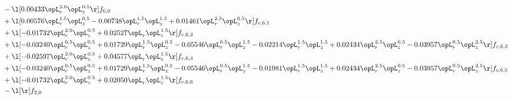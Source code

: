 \begin{alignat}{2}
& - \l[  0.00433 \opL_r^{2.0} \opL_z^{0.5}  \r] f_{6,0} \nonumber \\ 
& + \l[  0.00576 \opL_r^{1.5} \opL_z^{0.5}   -0.00738 \opL_r^{1.5} \opL_z^{1.5} +  0.01461 \opL_r^{2.5} \opL_z^{0.5}  \r] f_{c,6,1} \nonumber \\ 
& + \l[  -0.01732 \opL_r^{2.0} \opL_z^{0.5} +  0.02527 \opL_r \opL_z^{1.5}  \r] f_{c,6,2} \nonumber \\ 
& + \l[  -0.03240 \opL_r^{0.5} \opL_z^{0.5} +  0.01729 \opL_r^{1.5} \opL_z^{0.5}   -0.05546 \opL_r^{0.5} \opL_z^{1.5}   -0.02214 \opL_r^{1.5} \opL_z^{1.5} +  0.02434 \opL_r^{2.5} \opL_z^{0.5}   -0.03957 \opL_r^{0.5} \opL_z^{2.5}  \r] f_{c,6,3} \nonumber \\ 
& + \l[  -0.02597 \opL_r^{2.0} \opL_z^{0.5} +  0.04577 \opL_r \opL_z^{1.5}  \r] f_{c,6,4} \nonumber \\ 
& + \l[  -0.03240 \opL_r^{0.5} \opL_z^{0.5} +  0.01729 \opL_r^{1.5} \opL_z^{0.5}   -0.05546 \opL_r^{0.5} \opL_z^{1.5}   -0.01981 \opL_r^{1.5} \opL_z^{1.5} +  0.02434 \opL_r^{2.5} \opL_z^{0.5}   -0.03957 \opL_r^{0.5} \opL_z^{2.5}  \r] f_{c,6,5} \nonumber \\ 
& + \l[  -0.01732 \opL_r^{2.0} \opL_z^{0.5} +  0.02050 \opL_r \opL_z^{1.5}  \r] f_{c,6,6} \nonumber \\ 
& - \l[  \r] f_{2,0} \nonumber \\ 
\end{alignat} 


